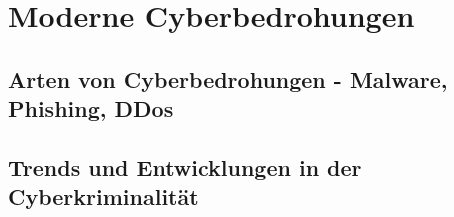 \newpage


\section{Moderne Cyberbedrohungen}\label{sec:moderne-cyberbedrohungen}
\subsection[Arten von Cyberbedrohungen]{Arten von Cyberbedrohungen - Malware, Phishing, DDos}\label{subsec:arten-von-cyberbedrohungen---malware-phishing-ddos}

\subsection{Trends und Entwicklungen in der Cyberkriminalität}\label{subsec:trends-und-entwicklungen-in-der-cyberkriminalitat}